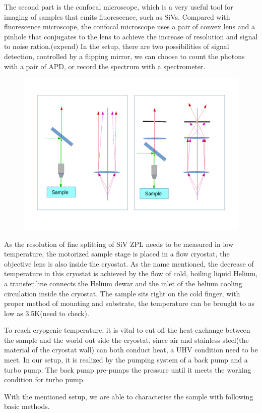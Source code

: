 The second part is the confocal microscope, which is a very useful tool for imaging of samples that emits fluorescence, such as SiVs. Compared with fluorescence microscope, the confocal microscope uses a pair of convex lens and a pinhole that conjugates to the lens to achieve the increase of resolution and signal to noise ration.(expend)
In the setup, there are two possibilities of signal detection, controlled by a flipping mirror, we can choose to count the photons with a pair of APD, or record the spectrum with a spectrometer.
\begin{figure}[h]
\centering
\includegraphics[width=0.7\linewidth]{Figures/pic/microscope}
\caption{}
\label{fig:microscope}
\end{figure}

As the resolution of fine splitting of SiV ZPL needs to be measured in low temperature, the motorized sample stage is placed in a flow cryostat, the objective lens is also inside the cryostat. As the name mentioned, the decrease of temperature in this cryostat is achieved by the flow of cold, boiling liquid Helium, a transfer line connects the Helium dewar and the inlet of the helium cooling circulation inside the cryostat. The sample sits right on the cold finger, with proper method of mounting and substrate, the temperature can be brought to as low as 3.5K(need to check).

To reach cryogenic temperature, it is vital to cut off the heat exchange between the sample and the world out side the cryostat, since air and stainless steel(the material of the cryostat wall) can both conduct heat, a UHV condition need to be meet. In our setup, it is realized by the pumping system of a back pump and a turbo pump. The back pump pre-pumps the pressure until it meets the working condition for turbo pump.

With the mentioned setup, we are able to characterise the sample with following basic methods.


